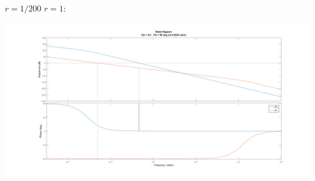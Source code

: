 \documentclass[12pt]{article}
\begin{document}
\clearpage
$r=1/200$
$r=1$: 
\begin{flushleft}
\includegraphics[width=\textwidth,height=\textheight,keepaspectratio]{Bode_1.PNG}
\end{flushleft}
\end{document}
